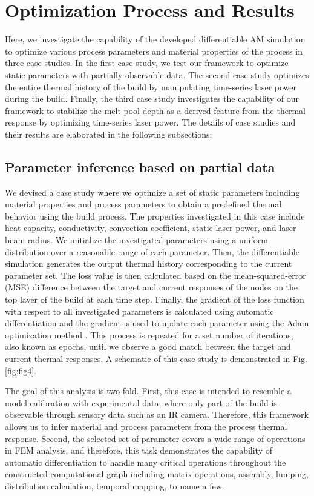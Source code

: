 \documentclass{article}
\begin{document}
\section{Optimization Process and Results}

Here, we investigate the capability of the developed differentiable AM simulation to optimize various process parameters and material properties of the process in three case studies. In the first case study, we test our framework to optimize static parameters with partially observable data. The second case study optimizes the entire thermal history of the build by manipulating time-series laser power during the build. Finally, the third case study investigates the capability of our framework to stabilize the melt pool depth as a derived feature from the thermal response by optimizing time-series laser power. The details of case studies and their results are elaborated in the following subsections:

\subsection{Parameter inference based on partial data}

We devised a case study where we optimize a set of static parameters including material properties and process parameters to obtain a predefined thermal behavior using the build process. The properties investigated in this case include heat capacity, conductivity, convection coefficient, static laser power, and laser beam radius. We initialize the investigated parameters using a uniform distribution over a reasonable range of each parameter. Then, the differentiable simulation generates the output thermal history corresponding to the current parameter set. The loss value is then calculated based on the mean-squared-error (MSE) difference between the target and current responses of the nodes on the top layer of the build at each time step. Finally, the gradient of the loss function with respect to all investigated parameters is calculated using automatic differentiation and the gradient is used to update each parameter using the Adam optimization method \citep{13}. This process is repeated for a set number of iterations, also known as epochs, until we observe a good match between the target and current thermal responses. A schematic of this case study is demonstrated in Fig.\ref{fig:fig4}.

The goal of this analysis is two-fold. First, this case is intended to resemble a model calibration with experimental data, where only part of the build is observable through sensory data such as an IR camera. Therefore, this framework allows us to infer material and process parameters from the process thermal response. Second, the selected set of parameter covers a wide range of operations in FEM analysis, and therefore, this task demonstrates the capability of automatic differentiation to handle many critical operations throughout the constructed computational graph including matrix operations, assembly, lumping, distribution calculation, temporal mapping, to name a few.
\end{document}
